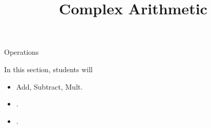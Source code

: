 \documentclass{ximera}
\title{Complex Arithmetic}
\begin{document}
\begin{abstract}
\end{abstract}
\maketitle







Operations












\begin{sectionOutcomes}
In this section, students will 

\begin{itemize}
\item Add, Subtract, Mult.
\item .
\item .
\end{itemize}
\end{sectionOutcomes}
\end{document}
